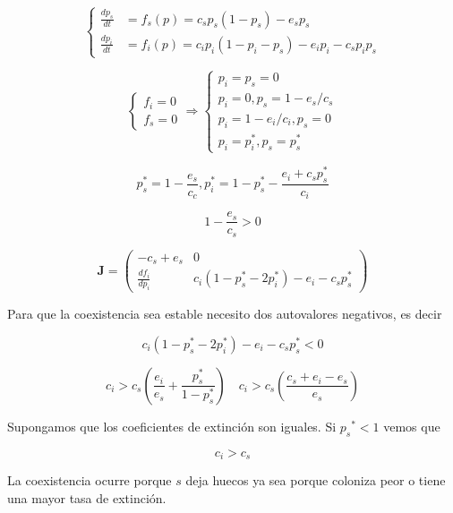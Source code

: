 \documentclass[twocolumn,aps,prl]{revtex4-1}
\begin{document}
$$
\left\{
\begin{aligned}
    \frac{d p_{s}}{d t} &=f_{s}(p)=c_{s} p_{s}\left(1-p_{s}\right)-e_{s} p_{s} \\ 
    \frac{d p_{i}}{d t} &=f_{i}(p)=c_{i} p_{i}\left(1-p_{i}-p_{s}\right)-e_{i} p_{i}-c_{s} p_{i} p_{s}
\end{aligned} 
\right.
$$

$$
\left\{
\begin{array} { l } 
    { f _ { i } = 0 } \\
    { f _ { s } = 0 }
\end{array} 
\right. 
\Rightarrow 
\left\{
\begin{array}{l}
    p_{i}=p_{s}=0 \\
    p_{i}=0, p_{s}=1-e_{s} / c_{s} \\
    p_{i}=1-e_{i} / c_{i}, p_{s}=0 \\
    p_{i}=p_{i}^{*}, p_{s}=p_{s}^{*}
\end{array}
\right.
$$



$$
p_{s}^{*}=1-\frac{e_{s}}{c_{c}}, p_{i}^{*}=1-p_{s}^{*}-\frac{e_{i}+c_{s} p_{s}^{*}}{c_{i}}
$$

$$
1 - \frac{e_{s}}{c_{s}} > 0
$$

\begin{equation}
    \mathbf{J}=\left(
    \begin{array}{cc}
        -c_{s}+e_{s} & 0 \\
        \frac{d f_{i}}{d p_{i}} & c_{i}\left(1-p_{s}^{*}-2 p_{i}^{*}\right)-e_{i}-c_{s} p_{s}^{*}
    \end{array}
    \right)
\end{equation}

Para que la coexistencia sea estable necesito dos autovalores negativos, es decir

$$
c_{i}\left(1-p_{s}^{*}-2 p_{i}^{*}\right)-e_{i}-c_{s} p_{s}^{*}<0
$$

$$
c_{i}>c_{s}\left(\frac{e_{i}}{e_{s}}+\frac{p_{s}^{*}}{1-p_{s}^{*}}\right) \quad c_{i}>c_{s}\left(\frac{c_{s}+e_{i}-e_{s}}{e_{s}}\right)
$$

Supongamos que los coeficientes de extinción son iguales. Si $p_{s}{ }^{*}<1$ vemos que

$$
c_{i}>c_{s}
$$

La coexistencia ocurre porque $s$ deja huecos ya sea porque coloniza peor o tiene una mayor tasa de extinción.

% 
\end{document}
